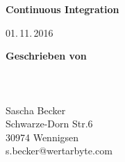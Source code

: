 \documentclass[11pt,DIV12,BCOR0mm,oneside,headings=normal,%
  numbers=noenddot,headsepline,headinclude]{scrreprt}
\begin{document}

\thispagestyle{empty}
{}

\begin{center}
  \vspace*{4\baselineskip}
  {\sffamily\bfseries\LARGE
    Continuous Integration\par}
  
  \vspace*{4\baselineskip}
  {\Large }

  \vfill
  {\Large }
  
  \vspace*{4\baselineskip}
  {\Large \par}
  
  \vspace*{4\baselineskip}
  {\Large 01.\,11.\,2016}
  
  \vspace*{4\baselineskip}
\end{center}


{\huge\textbf{Geschrieben von}} \\
\\
\\
\textbf{} \\
Sascha Becker \\
Schwarze-Dorn Str.6 \\
30974 Wennigsen \\
s.becker@wertarbyte.com \\
\\
\\
\\
\\
\\
\\
\\
\\
\\
\\
\\
\\
\\
\\
\\
\\
\\
\\
\\
\\
\\
\\


\tableofcontents    %


\newpage
{}




\renewcommand{\btxfnamespaceshort}{\,}


\end{document}
